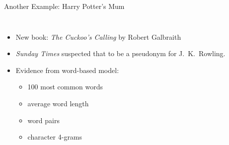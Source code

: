 \documentclass[professionalfonts, xcolor={usenames,svgnames,x11names,table}]{beamer}
\begin{document}
\begin{frame}{Another Example: Harry Potter's Mum}
    \begin{columns}
        \begin{itemize}
            \item New book: \emph{The Cuckoo's Calling} by Robert Galbraith
            \item \emph{Sunday Times} suspected that to be a pseudonym for J.~K.~Rowling.
            \item Evidence from word-based model: 
            \begin{itemize}
                \item 100 most common words
                \item average word length
                \item word pairs\\
                \item character 4-grams\\
            \end{itemize}
        \end{itemize}


\end{columns}
\end{frame}
\end{document}
